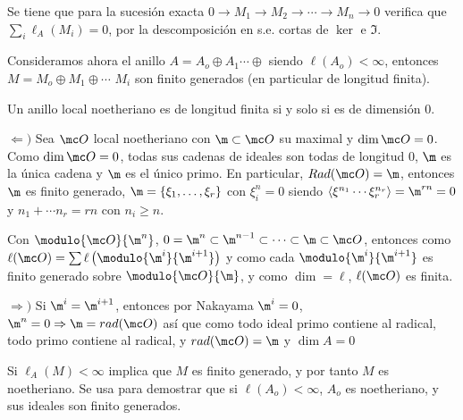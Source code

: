 \begin{obs}
    Se tiene que para la sucesi\'on exacta $0\to M_1 \to M_2 \to \cdots \to M_n \to 0$ verifica que $\sum_i \ell_A(M_i) = 0$, por la descomposici\'on en s.e. cortas de $\ker$ e $\Im$. 
\end{obs}
\begin{ejem}
    Consideramos ahora el anillo $A=A_o\oplus A_1\cdots \oplus $ siendo $\ell(A_o) < \infty$, entonces $M=M_o \oplus M_1\oplus \cdots$ $M_i$ son finito generados (en particular de longitud finita).
\end{ejem}\begin{teo}
    Un anillo local noetheriano es de longitud finita si y solo si es de dimensi\'on 0.
\end{teo}
\begin{dem}
    $\Leftarrow)$ Sea $\mc O$ local noetheriano con $\m \subset \mc O$ su maximal y $\dim \mc O = 0$. Como $\dim \mc O =0$, todas sus cadenas de ideales son todas de longitud 0, $\m$ es la \'unica cadena y $\m$ es el \'unico primo. En particular, $Rad(\mc O) = \m$, entonces $\m$ es finito generado, $\m= \{\xi_1,\ldots, \xi_r\}$ con $\xi^n_i =0$ siendo $\langle \xi^{n_1} \cdots \xi_r^{n_r} \rangle = \m^{rn}=0$ y $n_1+\cdots n_r = rn$ con $n_i \ge n$. 

    Con $\modulo{\mc O}{\m^n}$, $0 = \m^n \subset \m^{n-1} \subset \cdots \subset \m \subset \mc O$, entonces como $\ell(\mc O) = \sum \ell\left( \modulo{\m^i}{\m^{i+1}}\right)$ y como cada $\modulo{\m^i}{\m^{i+1}}$ es finito generado sobre $\modulo{\mc O}{\m}$, y como $\dim = \ell$, $\ell(\mc O)$ es finita. 
    
    $\Rightarrow)$ Si $\m^i = \m^{i+1}$, entonces por Nakayama $\m^i=0$, $\m^n=0 \Rightarrow \m =rad(\mc O)$ as\'i que como todo ideal primo contiene al radical, todo primo contiene al radical, y $rad(\mc O ) = \m$ y $\dim A = 0$
\end{dem}

\begin{ejer}
    Si $\ell_A(M) < \infty$ implica que $M$ es finito generado, y por tanto $M$ es noetheriano. Se usa para demostrar que si $\ell(A_o) < \infty$, $A_o$ es noetheriano, y sus ideales son finito generados. 
\end{ejer}


